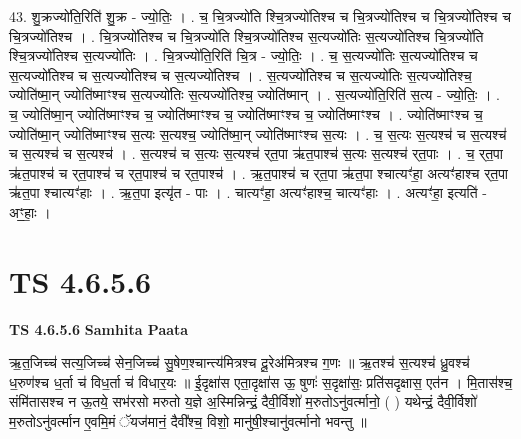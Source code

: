 \documentclass[17pt]{extarticle}
\begin{document}
43. शु॒क्रज्यो॑ति॒रिति॑ शु॒क्र - ज्यो॒तिः॒ । . च॒ चि॒त्रज्यो॑ति श्चि॒त्रज्यो॑तिश्च च चि॒त्रज्यो॑तिश्च च चि॒त्रज्यो॑तिश्च च चि॒त्रज्यो॑तिश्च । . चि॒त्रज्यो॑तिश्च च चि॒त्रज्यो॑ति श्चि॒त्रज्यो॑तिश्च स॒त्यज्यो॑तिः स॒त्यज्यो॑तिश्च चि॒त्रज्यो॑ति श्चि॒त्रज्यो॑तिश्च स॒त्यज्यो॑तिः । . चि॒त्रज्यो॑ति॒रिति॑ चि॒त्र - ज्यो॒तिः॒ । . च॒ स॒त्यज्यो॑तिः स॒त्यज्यो॑तिश्च च स॒त्यज्यो॑तिश्च च स॒त्यज्यो॑तिश्च च स॒त्यज्यो॑तिश्च । . स॒त्यज्यो॑तिश्च च स॒त्यज्यो॑तिः स॒त्यज्यो॑तिश्च॒ ज्योति॑ष्मा॒न् ज्योति॑ष्माꣳश्च स॒त्यज्यो॑तिः स॒त्यज्यो॑तिश्च॒ ज्योति॑ष्मान् । . स॒त्यज्यो॑ति॒रिति॑ स॒त्य - ज्यो॒तिः॒ । . च॒ ज्योति॑ष्मा॒न् ज्योति॑ष्माꣳश्च च॒ ज्योति॑ष्माꣳश्च च॒ ज्योति॑ष्माꣳश्च च॒ ज्योति॑ष्माꣳश्च । . ज्योति॑ष्माꣳश्च च॒ ज्योति॑ष्मा॒न् ज्योति॑ष्माꣳश्च स॒त्यः स॒त्यश्च॒ ज्योति॑ष्मा॒न् ज्योति॑ष्माꣳश्च स॒त्यः । . च॒ स॒त्यः स॒त्यश्च॑ च स॒त्यश्च॑ च स॒त्यश्च॑ च स॒त्यश्च॑ । . स॒त्यश्च॑ च स॒त्यः स॒त्यश्च॑ र्‌त॒पा ऋ॑त॒पाश्च॑ स॒त्यः स॒त्यश्च॑ र्‌त॒पाः । . च॒ र्‌त॒पा ऋ॑त॒पाश्च॑ च र्‌त॒पाश्च॑ च र्‌त॒पाश्च॑ च र्‌त॒पाश्च॑ । . ऋ॒त॒पाश्च॑ च र्‌त॒पा ऋ॑त॒पा श्चात्यꣳ॑हा॒ अत्यꣳ॑हाश्च र्‌त॒पा ऋ॑त॒पा श्चात्यꣳ॑हाः । . ऋ॒त॒पा इत्यृ॑त - पाः । . चात्यꣳ॑हा॒ अत्यꣳ॑हाश्च॒ चात्यꣳ॑हाः । . अत्यꣳ॑हा॒ इत्यति॑ - अꣳ॒॒हाः॒ । \newline
\pagebreak
{}

\section{ TS 4.6.5.6 }

\textbf{TS 4.6.5.6 } \newline
\textbf{Samhita Paata} \newline

ऋ॒त॒जिच्च॑ सत्य॒जिच्च॑ सेन॒जिच्च॑ सु॒षेण॒श्चान्त्य॑मित्रश्च दू॒रेअ॑मित्रश्च ग॒णः ॥ ऋ॒तश्च॑ स॒त्यश्च॑ ध्रु॒वश्च॑ ध॒रुण॑श्च ध॒र्ता च॑ विध॒र्ता च॑ विधार॒यः ॥ ई॒दृक्षा॑स एता॒दृक्षा॑स ऊ॒ षुणः॑ स॒दृक्षा॑सः॒ प्रति॑सदृक्षास॒ एत॑न । मि॒तास॑श्च॒ संमि॑तासश्च न ऊ॒तये॒ सभ॑रसो मरुतो य॒ज्ञे अ॒स्मिन्निन्द्रं॒ दैवी॒र्विशो॑ म॒रुतोऽनु॑वर्त्मानो॒ ( ) यथेन्द्रं॒ दैवी॒र्विशो॑ म॒रुतोऽनु॑वर्त्मान ए॒वमि॒मं ॅयज॑मानं॒ दैवी᳚श्च॒ विशो॒ मानु॑षी॒श्चानु॑वर्त्मानो भवन्तु ॥ \newline
\end{document}

